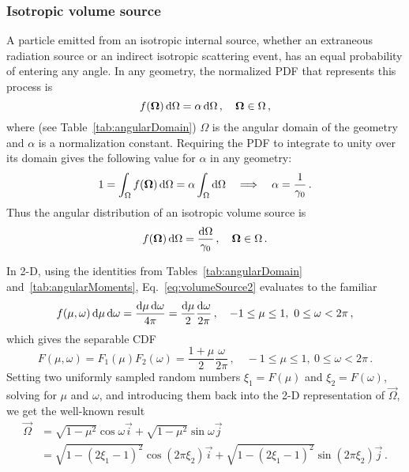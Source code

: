 \subsubsection{Isotropic volume source}
A particle emitted from an isotropic internal source, whether an extraneous
radiation source or an indirect isotropic scattering event, has an equal
probability of entering any angle. In any geometry, the normalized PDF that
represents this process is
\begin{equation}\label{eq:volumeSource1}
  f(\bm{\Omega}) \mathop{}\!\mathrm{d} \Omega = \alpha \mathop{}\!\mathrm{d} \Omega \,,
  \quad \bm{\Omega} \in \Omega \,,
\end{equation}
where (see Table~\ref{tab:angularDomain}) $\Omega$ is the angular domain of the
geometry and $\alpha$ is a normalization constant.
Requiring the PDF to integrate to unity over its domain gives the
following value for $\alpha$ in any geometry:
\begin{align*}
  1 = \int_{\Omega} f(\bm{\Omega}) \mathop{}\!\mathrm{d}\Omega
  = \alpha \int_{\Omega} \mathop{}\!\mathrm{d}\Omega
  \quad \Longrightarrow \quad
  \alpha = \frac{1}{\gamma_0}\,.
\end{align*}
Thus the angular distribution of an isotropic volume source is
\begin{equation}\label{eq:volumeSource2}
  f(\bm{\Omega}) \mathop{}\!\mathrm{d} \Omega = \frac{\mathop{}\!\mathrm{d}\Omega}{\gamma_0} \,,
  \quad \bm{\Omega} \in \Omega\,.
\end{equation}

In 2-D, using the identities from Tables~\ref{tab:angularDomain}
and~\ref{tab:angularMoments}, Eq.~\eqref{eq:volumeSource2} evaluates to the
familiar
\begin{equation*}
  f(\mu,\omega) \mathop{}\!\mathrm{d}\mu\mathop{}\!\mathrm{d}\omega = \frac{\mathop{}\!\mathrm{d}\mu\mathop{}\!\mathrm{d}\omega}{4\pi} 
  = \frac{\mathop{}\!\mathrm{d}\mu}{2}\frac{\mathop{}\!\mathrm{d}\omega}{2\pi}
  \,,
  \quad -1\le \mu \le 1,\ 0 \le \omega < 2\pi\,,
\end{equation*}
which gives the separable CDF
\begin{equation*}
  F(\mu,\omega) = F_1(\mu) F_2(\omega)
  = \frac{1 + \mu}{2}\frac{\omega}{2\pi}\,,
  \quad -1\le \mu \le 1,\ 0 \le \omega < 2\pi\,.
\end{equation*}
Setting two uniformly sampled random numbers $\xi_1 = F(\mu)$ and
$\xi_2 = F(\omega)$, solving for $\mu$ and $\omega$, and
introducing them back into the 2-D representation of $\vec{\Omega}$, we get the
well-known result
\begin{align*}
  \vec{\Omega} &= \sqrt{1-\mu^2} \cos \omega \vec{i}
  + \sqrt{1-\mu^2} \sin \omega \vec{j}
\\
  &= \sqrt{1-(2\xi_1-1)^2} \cos(2\pi\xi_2) \vec{i}
  + \sqrt{1-(2\xi_1-1)^2} \sin(2\pi\xi_2) \vec{j}\,.
\end{align*}

